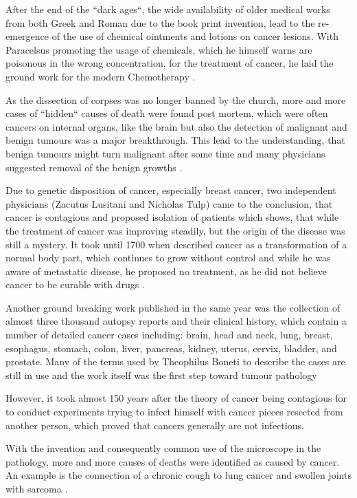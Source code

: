 After the end of the ``dark ages``, the wide availability of older medical works from both Greek and Roman due to the book print invention, lead to the re-emergence of the use of chemical ointments and lotions on cancer lesions. With Paracelsus promoting the usage of chemicals, which he himself warns are poisonous in the wrong concentration, for the treatment of cancer, he laid the ground work for the modern Chemotherapy \cite{PHT1562}.

As the dissection of corpses was no longer banned by the church, more and more cases of ``hidden`` causes of death were found post mortem, which were often cancers on internal organs, like the brain but also the detection of malignant and benign tumours was a major breakthrough. This lead to the understanding, that  benign tumours might turn malignant after some time and many physicians suggested removal of the benign growths \cite{Severino1632}.

Due to genetic disposition of cancer, especially breast cancer, two independent physicians (Zacutus Lusitani and Nicholas Tulp) came to the conclusion, that cancer is contagious and proposed isolation of patients \cite{Lusitani1649,Tulpii1652} which shows, that while the treatment of cancer was improving steadily, but the origin of the disease was still a mystery. It took until 1700 when \citeauthor{DeshaiesGendron1701} described cancer as a transformation of a normal body part, which continues to grow without control and while he was aware of metastatic disease, he proposed no treatment, as he did not believe cancer to be curable with drugs \cite{DeshaiesGendron1701}. 

Another ground breaking work published in the same year was the collection of almost three thousand autopsy reports and their clinical history, which contain a number of detailed cancer cases including: brain, head and neck, lung, breast, esophagus, stomach, colon, liver, pancreas, kidney, uterus, cervix, bladder, and prostate. Many of the terms used by Theophilus Boneti to describe the cases are still in use and the work itself was the first step toward tumour pathology \cite{Hajdu2010a}


However, it took almost 150 years after the theory of cancer being contagious for \textcite{Nooth1804} to conduct experiments trying to infect himself with cancer pieces resected from another person, which proved that cancers generally are not infectious.

With the invention and consequently common use of the microscope in the pathology, more and more causes of deaths were identified as caused by cancer. An example is the connection of a chronic cough to lung cancer and swollen joints with sarcoma \cite{Etmueller2018}.

